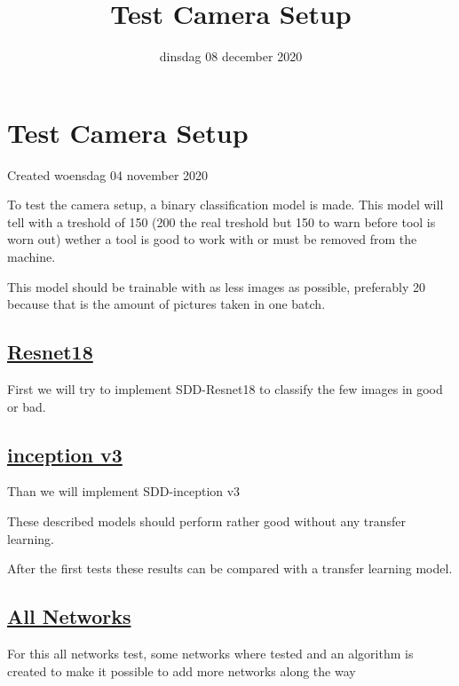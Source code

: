 \documentclass{scrartcl}
\title{Test Camera Setup}
\date{dinsdag 08 december 2020}
\author{}
\begin{document}
\maketitle

		\section{Test Camera Setup}

Created woensdag 04 november 2020



To test the camera setup, a binary classification model is made. This model will tell with a treshold of 150 (200 the real treshold but 150 to warn before tool is worn out) wether a tool is good to work with or must be removed from the machine. 

This model should be trainable with as less images as possible, preferably 20 because that is the amount of pictures taken in one batch.





\subsection{\href{./Test_Camera_Setup/Resnet18.tex}{Resnet18}}

First we will try to implement SDD-Resnet18 to classify the few images in good or bad. 



\subsection{\href{./Test_Camera_Setup/inception_v3.tex}{inception v3}}

Than we will implement SDD-inception v3 



These described models should perform rather good without any transfer learning. 

After the first tests these results can be compared with a transfer learning model.





\subsection{\href{./Test_Camera_Setup/All_Networks.tex}{All Networks}}

For this all networks test, some networks where tested and an algorithm is created to make it possible to add more networks along the way
\end{document}

